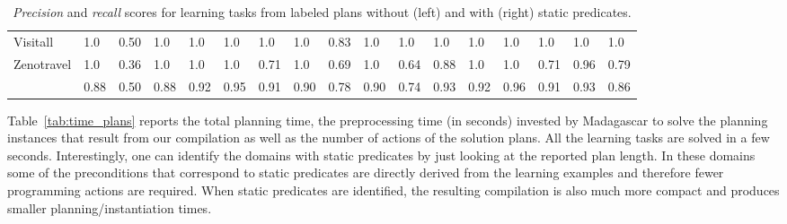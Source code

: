 \documentclass[3p,times]{elsarticle}
\begin{document}
\begin{table*}[hbt!]
{\begin{tabular}{l|l|l|l|l|l|l||l|l||l|l|l|l|l|l||l|l|}
			Visitall & 1.0 & 0.50 & 1.0 & 1.0 & 1.0 & 1.0 & 1.0 & 0.83 & 1.0 & 1.0 & 1.0 & 1.0 & 1.0 & 1.0 & 1.0 & 1.0\\
			Zenotravel & 1.0 & 0.36 & 1.0 & 1.0 & 1.0 & 0.71 & 1.0 & 0.69 &1.0 & 0.64 & 0.88 & 1.0 & 1.0 & 0.71 & 0.96 & 0.79\\
			\hline
			\bf  & 0.88 & 0.50 & 0.88 & 0.92 & 0.95 & 0.91 & 0.90 & 0.78 & 0.90 & 0.74 & 0.93 & 0.92 & 0.96 & 0.91 & 0.93 & 0.86\\
		\end{tabular}
	}
\caption{\small {\em Precision} and {\em recall} scores for learning tasks from labeled plans without (left) and with (right) static predicates.}
\label{tab:results_plans}
\end{table*}

Table~\ref{tab:time_plans} reports the total planning time, the preprocessing time (in seconds) invested by {\sc Madagascar} to solve the planning instances that result from our compilation as well as the number of actions of the solution plans. All the learning tasks are solved in a few seconds. Interestingly, one can identify the domains with static predicates by just looking at the reported plan length. In these domains some of the preconditions that correspond to static predicates are directly derived from the learning examples and therefore fewer programming actions are required. When static predicates are identified, the resulting compilation is also much more compact and produces smaller planning/instantiation times.
\end{document}
